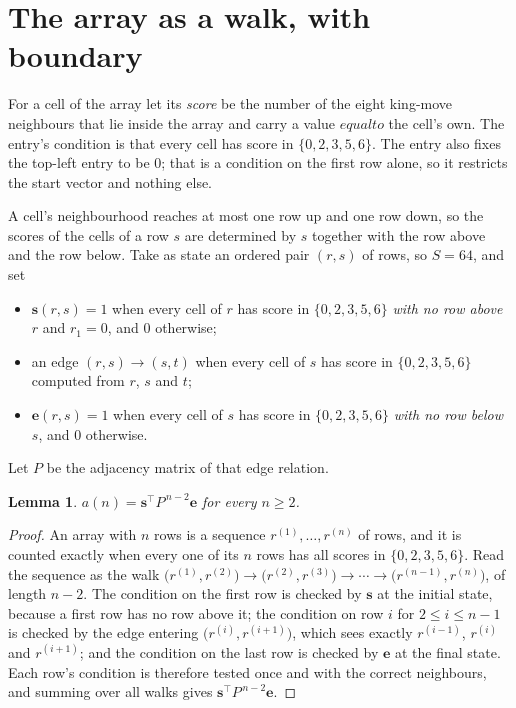 \documentclass[11pt,a4paper]{article}
\theoremstyle{plain}
\newtheorem{lemma}[theorem]{Lemma}
\theoremstyle{definition}
\begin{document}
\section{The array as a walk, with boundary}

For a cell of the array let its \emph{score} be the number of the eight king-move neighbours that lie inside
the array and carry a value $equal to$ the cell's own. The entry's condition is that every cell
has score in $\{0,2,3,5,6\}$. The entry also fixes the top-left entry to be $0$; that is a condition on the first row alone, so it restricts the start vector and nothing else.

A cell's neighbourhood reaches at most one row up and one row down, so the scores of the
cells of a row $s$ are determined by $s$ together with the row above and the row below.
Take as state an ordered pair $(r,s)$ of rows, so $S=64$, and set
\begin{itemize}
\item $\mathbf{s}(r,s)=1$ when every cell of $r$ has score in $\{0,2,3,5,6\}$ \emph{with no row
above $r$} and $r_1=0$, and $0$ otherwise;
\item an edge $(r,s)\to(s,t)$ when every cell of $s$ has score in $\{0,2,3,5,6\}$ computed from
$r$, $s$ and $t$;
\item $\mathbf{e}(r,s)=1$ when every cell of $s$ has score in $\{0,2,3,5,6\}$ \emph{with no row
below $s$}, and $0$ otherwise.
\end{itemize}
Let $P$ be the adjacency matrix of that edge relation.

\begin{lemma}\label{lem:walk}
$a(n)=\mathbf{s}^{\!\top}P^{\,n-2}\mathbf{e}$ for every $n\ge2$.
\end{lemma}

\begin{proof}
An array with $n$ rows is a sequence $r^{(1)},\dots,r^{(n)}$ of rows, and it is counted
exactly when every one of its $n$ rows has all scores in $\{0,2,3,5,6\}$. Read the sequence as the
walk $\bigl(r^{(1)},r^{(2)}\bigr)\to\bigl(r^{(2)},r^{(3)}\bigr)\to\cdots\to
\bigl(r^{(n-1)},r^{(n)}\bigr)$, of length $n-2$. The condition on the first row is
checked by $\mathbf{s}$ at the initial state, because a first row has no row above it; the
condition on row $i$ for $2\le i\le n-1$ is checked by the edge entering
$\bigl(r^{(i)},r^{(i+1)}\bigr)$, which sees exactly $r^{(i-1)}$, $r^{(i)}$ and
$r^{(i+1)}$; and the condition on the last row is checked by $\mathbf{e}$ at the final
state. Each row's condition is therefore tested once and with the correct neighbours, and
summing over all walks gives $\mathbf{s}^{\!\top}P^{\,n-2}\mathbf{e}$.
\end{proof}
\end{document}
